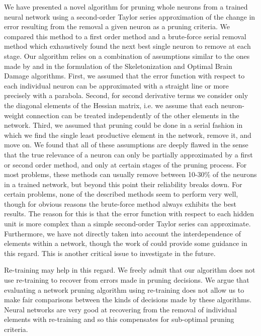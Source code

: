We have presented a novel algorithm for pruning whole neurons from a trained neural network using a second-order Taylor series approximation of the change in error resulting from the removal a given neuron as a pruning criteria. We compared this method to a first order method and a brute-force serial removal method which exhaustively found the next best single neuron to remove at each stage. Our algorithm relies on a combination of assumptions similar to the ones made by \cite{mozer1989skeletonization} and \cite{lecun1989optimal} in the formulation of the Skeletonization and Optimal Brain Damage algorithms. First, we assumed that the error function with respect to each individual neuron can be approximated with a straight line or more precisely with a parabola. Second, for second derivative terms we consider only the diagonal elements of the Hessian matrix, i.e. we assume that each neuron-weight connection can be treated independently of the other elements in the network. Third, we assumed that pruning could be done in a serial fashion in which we find the single least productive element in the network, remove it, and move on. We found that all of these assumptions are deeply flawed in the sense that the true relevance of a neuron can only be partially approximated by a first or second order method, and only at certain stages of the pruning process. For most problems, these methods can usually remove between 10-30\% of the neurons in a trained network, but beyond this point their reliability breaks down. For certain problems, none of the described methods seem to perform very well, though for obvious reasons the brute-force method always exhibits the best results. The reason for this is that the error function with respect to each hidden unit is more complex than a simple second-order Taylor series can approximate. Furthermore, we have not directly taken into account the interdependence of elements within a network, though the work of \cite{hassibi1993second} could provide some guidance in this regard. This is another critical issue to investigate in the future. 

Re-training may help in this regard. We freely admit that our algorithm does not use re-training to recover from errors made in pruning decisions. We argue that evaluating a network pruning algorithm using re-training does not allow us to make fair comparisons between the kinds of decisions made by these algorithms. Neural networks are very good at recovering from the removal of individual elements with re-training and so this compensates for sub-optimal pruning criteria. 

